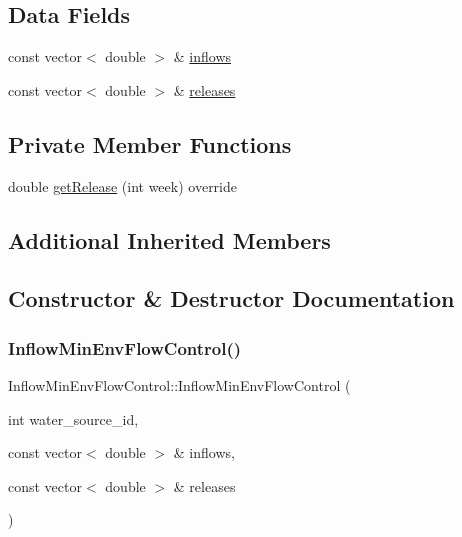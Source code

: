 \subsection*{Data Fields}
\begin{DoxyCompactItemize}
\item 
const vector$<$ double $>$ \& \mbox{\hyperlink{classInflowMinEnvFlowControl_a669660259afa9313c77094dec815a52f_a669660259afa9313c77094dec815a52f}{inflows}}
\item 
const vector$<$ double $>$ \& \mbox{\hyperlink{classInflowMinEnvFlowControl_a2f82b53516516be63eb169d377df1f55_a2f82b53516516be63eb169d377df1f55}{releases}}
\end{DoxyCompactItemize}
\subsection*{Private Member Functions}
\begin{DoxyCompactItemize}
\item 
double \mbox{\hyperlink{classInflowMinEnvFlowControl_a91bf5813168a995bd4ddf9e0ff553112_a91bf5813168a995bd4ddf9e0ff553112}{get\+Release}} (int week) override
\end{DoxyCompactItemize}
\subsection*{Additional Inherited Members}


\subsection{Constructor \& Destructor Documentation}
\mbox{\label{classInflowMinEnvFlowControl_aff6c04aaa6e206b29b072aea6fb38367_aff6c04aaa6e206b29b072aea6fb38367}} 
\subsubsection{\texorpdfstring{Inflow\+Min\+Env\+Flow\+Control()}{InflowMinEnvFlowControl()}\hspace{0.1cm}{\footnotesize\ttfamily [1/2]}}
{\footnotesize\ttfamily Inflow\+Min\+Env\+Flow\+Control\+::\+Inflow\+Min\+Env\+Flow\+Control (\begin{DoxyParamCaption}\item[{int}]{water\+\_\+source\+\_\+id,  }\item[{const vector$<$ double $>$ \&}]{inflows,  }\item[{const vector$<$ double $>$ \&}]{releases }\end{DoxyParamCaption})}

